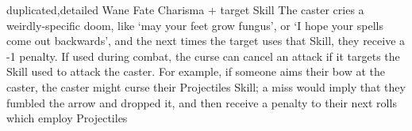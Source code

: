  {duplicated,detailed}%
  {Wane}%
  {Fate}%
  {Charisma + target Skill}%
  {The caster cries a weirdly-specific doom, like `may your feet grow fungus', or `I hope your spells come out backwards', and the next  times the target uses that Skill, they receive a -1 penalty.}%
  {If used during combat, the curse can cancel an attack if it targets the Skill used to attack the caster.
  For example, if someone aims their bow at the caster, the caster might curse their Projectiles Skill; a miss would imply that they fumbled the arrow and dropped it, and then receive a penalty to their next  rolls which employ Projectiles}
